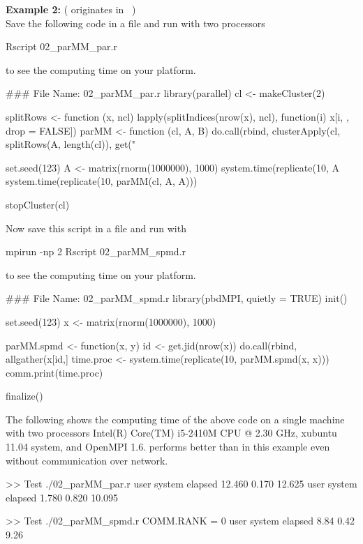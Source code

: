 {\bf Example 2:} ( originates in ~\citep{Tierney2012}) \\
Save the following code in a file and run with two processors
\begin{Command}
Rscript 02_parMM_par.r
\end{Command}
to see the computing time on your platform.
\begin{Code}[title=\pkg{snow} R Script]
### File Name: 02_parMM_par.r
library(parallel)
cl <- makeCluster(2)

splitRows <- function (x, ncl){
  lapply(splitIndices(nrow(x), ncl), function(i) x[i, , drop = FALSE])
}
parMM <- function (cl, A, B){
  do.call(rbind, clusterApply(cl, splitRows(A, length(cl)), get("%
}

set.seed(123)
A <- matrix(rnorm(1000000), 1000)
system.time(replicate(10, A %
system.time(replicate(10, parMM(cl, A, A)))

stopCluster(cl)
\end{Code}
Now save this script in a file and run with
\begin{Command}
mpirun -np 2 Rscript 02_parMM_spmd.r
\end{Command}
to see the computing time on your platform.
\begin{Code}[title=SPMD R Script]
### File Name: 02_parMM_spmd.r
library(pbdMPI, quietly = TRUE)
init()

set.seed(123)
x <- matrix(rnorm(1000000), 1000)

parMM.spmd <- function(x, y){
  id <- get.jid(nrow(x))
  do.call(rbind, allgather(x[id,] %
}
time.proc <- system.time(replicate(10, parMM.spmd(x, x)))
comm.print(time.proc)

finalize()
\end{Code}

The following shows the computing time of the above code
on a single machine with two processors
Intel(R) Core(TM) i5-2410M CPU @ 2.30 GHz, xubuntu 11.04 system,
and OpenMPI 1.6.  performs better than  in this
example even without communication over network.
\begin{CodeOutput}
>> Test ./02_parMM_par.r
   user  system elapsed 
 12.460   0.170  12.625 
   user  system elapsed 
  1.780   0.820  10.095 

>> Test ./02_parMM_spmd.r
COMM.RANK = 0
   user  system elapsed 
   8.84    0.42    9.26 
\end{CodeOutput}
